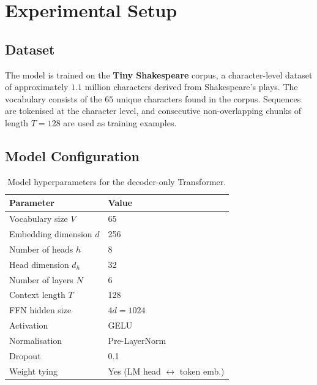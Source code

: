 \section{Experimental Setup}
\label{sec:setup}

\subsection{Dataset}
The model is trained on the \textbf{Tiny Shakespeare} corpus, a 
character-level dataset of approximately $1.1$ million characters derived 
from Shakespeare's plays. The vocabulary consists of the $65$ unique 
characters found in the corpus. Sequences are tokenised at the character 
level, and consecutive non-overlapping chunks of length $T = 128$ are used 
as training examples.

\subsection{Model Configuration}
\begin{table}[H]
\centering
\caption{Model hyperparameters for the decoder-only Transformer.}
\label{tab:model}
\begin{tabular}{ll}
\toprule
\textbf{Parameter} & \textbf{Value} \\
\midrule
Vocabulary size $V$        & 65 \\
Embedding dimension $d$    & 256 \\
Number of heads $h$        & 8 \\
Head dimension $d_h$       & 32 \\
Number of layers $N$       & 6 \\
Context length $T$         & 128 \\
FFN hidden size            & $4d = 1024$ \\
Activation                 & GELU \\
Normalisation              & Pre-LayerNorm \\
Dropout                    & 0.1 \\
Weight tying               & Yes (LM head $\leftrightarrow$ token emb.) \\
\bottomrule
\end{tabular}
\end{table}

